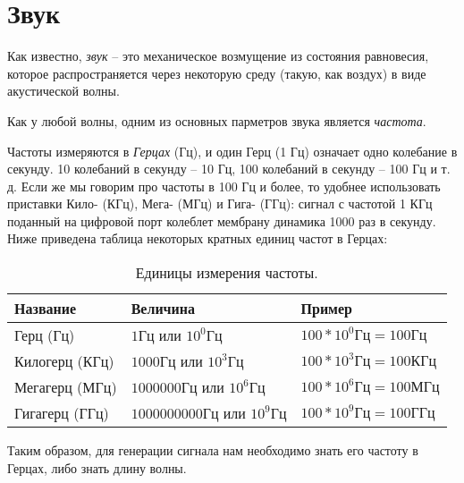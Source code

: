 \documentclass[../sparc.tex]{subfiles}
\begin{document}
\section{Звук}

Как известно, \emph{звук} -- это механическое возмущение из состояния равновесия,
которое распространяется через некоторую среду (такую, как воздух) в виде
акустической волны. \cite{britannica:sound}

Как у любой волны, одним из основных парметров звука является \emph{частота}.

Частоты измеряются в \emph{Герцах} (\gls{Гц}), и один Герц (1 Гц) означает одно
колебание в секунду. 10 колебаний в секунду -- 10 Гц, 100 колебаний в секунду --
100 Гц и т. д. Если же мы говорим про частоты в 100 Гц и более, то удобнее
использовать приставки Кило- (\gls{КГц}), Мега- (\gls{МГц}) и Гига- (\gls{ГГц}):
сигнал с частотой 1 КГц поданный на цифровой порт колеблет мембрану динамика
1000 раз в секунду.  Ниже приведена таблица некоторых кратных единиц частот в
Герцах:

\begin{table}[h]
  \centering
  \begin{tabular}{p{3cm}|p{4cm}|p{3.5cm}}
    Название & Величина & Пример \\
    \hline \hline
    Герц (Гц)
    & $ 1 \mbox{Гц} $ или $ 10^0 \mbox{Гц} $
    & $ 100 * 10^0 \mbox{Гц} = 100 \mbox{Гц} $ \\
    \hline
    Килогерц (КГц)
    & $ 1000 \mbox{Гц} $ или $ 10^3 \mbox{Гц} $
    & $ 100 * 10^3 \mbox{Гц} = 100 \mbox{КГц} $ \\
    \hline
    Мегагерц (МГц)
    & $ 1000000 \mbox{Гц} $ или $ 10^6 \mbox{Гц} $
    & $ 100 * 10^6 \mbox{Гц} = 100 \mbox{МГц} $ \\
    \hline
    Гигагерц (ГГц)
    & $ 1000000000 \mbox{Гц} $ или $ 10^9 \mbox{Гц} $
    & $ 100 * 10^9 \mbox{Гц} = 100 \mbox{ГГц} $ \\
  \end{tabular}
  \caption{Единицы измерения частоты.}
  \label{table:sound-hertz-scale}
\end{table}

Таким образом, для генерации сигнала нам необходимо знать его частоту в Герцах,
либо знать длину волны.
\end{document}
